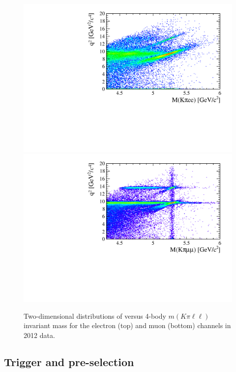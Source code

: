 \begin{figure}[t!]
\centering 
\includegraphics[width=1.\textwidth]{RKst/figs/electron_B0jpsi2D_selected.pdf}
\includegraphics[width=1.\textwidth]{RKst/figs/muon_B0jpsi2D_selected.pdf}
\caption{Two-dimensional distributions of \qsq versus 4-body $m(K\pi\ell\ell)$
invariant mass for the electron (top) and muon (bottom) channels in 2012 data.}
\label{fig:2D_q2_B0mass}
\end{figure}


\subsection{Trigger and pre-selection }
\label{sec:RKst_trigstripping}

